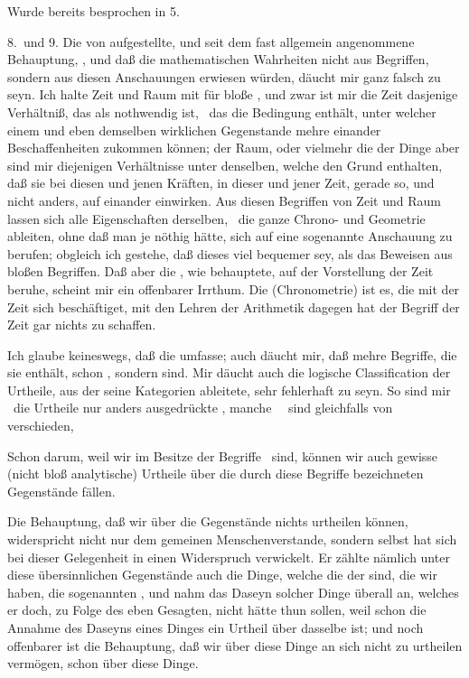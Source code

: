 \begin{aufza}
\item Wurde bereits besprochen in 5.
\item[8.~und 9.]\setcounter{enumi}{9} Die von  aufgestellte, und seit dem fast allgemein angenommene Behauptung, , und daß die mathematischen Wahrheiten nicht aus Begriffen, sondern aus diesen Anschauungen erwiesen würden, däucht mir ganz falsch zu seyn. Ich halte Zeit und Raum mit  für bloße , und zwar ist mir die Zeit dasjenige Verhältniß, das als  nothwendig ist, \dh\ das die Bedingung enthält, unter welcher einem und eben demselben wirklichen Gegenstande mehre einander  Beschaffenheiten zukommen können; der Raum, oder vielmehr die  der Dinge aber sind mir diejenigen Verhältnisse unter denselben, welche den Grund enthalten, daß sie bei diesen und jenen Kräften, in dieser und jener Zeit, gerade so, und nicht anders, auf einander einwirken. Aus diesen Begriffen von Zeit und Raum lassen sich alle Eigenschaften derselben, \dh\ die ganze Chrono- und Geometrie ableiten, ohne daß man je nöthig hätte, sich auf eine sogenannte Anschauung zu berufen; obgleich ich gestehe, daß dieses viel bequemer sey, als das Beweisen aus bloßen Begriffen. Daß aber die , wie  behauptete, auf der Vorstellung der Zeit beruhe, scheint mir ein offenbarer Irrthum. Die  (Chronometrie) ist es, die mit der Zeit sich beschäftiget, mit den Lehren der Arithmetik dagegen hat der Begriff der Zeit gar nichts zu schaffen.
\item Ich glaube keineswegs, daß die  umfasse; auch däucht mir, daß mehre Begriffe, die sie enthält, schon , sondern  sind. Mir däucht auch die logische Classification der Urtheile, aus der  seine Kategorien ableitete, sehr fehlerhaft zu seyn. So sind mir \zB\ die  Urtheile nur anders ausgedrückte , manche~\  sind gleichfalls  von  verschieden, \usw\
\item Schon darum, weil wir im Besitze der Begriffe  \usw\ sind, können wir auch gewisse (nicht bloß analytische) Urtheile über die durch diese Begriffe bezeichneten Gegenstände fällen.
\item Die \RWbet{Kant'sche} Behauptung, daß wir über die \RWbet{übersinnlichen} Gegenstände nichts urtheilen können, widerspricht nicht nur dem gemeinen Menschenverstande, sondern \RWbet{Kant} selbst hat sich bei dieser Gelegenheit in einen Widerspruch verwickelt. Er zählte nämlich unter diese übersinnlichen Gegenstände auch die Dinge, welche die  der  sind, die wir haben, die sogenannten , und nahm das Daseyn solcher Dinge überall an, welches er doch, zu Folge des eben Gesagten, nicht hätte thun sollen, weil schon die Annahme des Daseyns eines Dinges ein Urtheil über dasselbe ist; und noch offenbarer ist die Behauptung, daß wir über diese Dinge an sich nicht zu urtheilen vermögen, schon  über diese Dinge.

\end{aufza}
